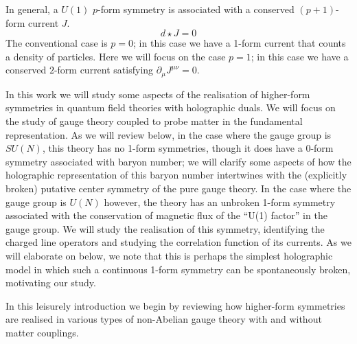 \documentclass[aps,preprint,nofootinbib,preprintnumbers,eqsecnum,superscriptaddress]{revtex4}
\begin{document}
In general, a $U(1)$ $p$-form symmetry is associated with a conserved $(p+1)$-form current $J$.
\begin{equation}
	d \star J = 0	
\end{equation}
The conventional case is $p = 0$; in this case we have a 1-form current that counts a density of particles. Here we will focus on the case $p =1$; in this case we have a conserved $2$-form current satisfying $\partial_\mu J^{\mu \nu} = 0$.  

In this work we will study some aspects of the realisation of higher-form symmetries in quantum field theories with holographic duals. We will focus on the study of gauge theory coupled to probe matter in the fundamental representation. As we will review below, in the case where the gauge group is $SU(N)$, this theory has no 1-form symmetries, though it does have a 0-form symmetry associated with baryon number; we will clarify some aspects of how the holographic representation of this baryon number intertwines with the (explicitly broken) putative center symmetry of the pure gauge theory. In the case where the gauge group is $U(N)$ however, the theory has an unbroken 1-form symmetry associated with the conservation of magnetic flux of the ``U(1) factor'' in the gauge group. We will study the realisation of this symmetry, identifying the charged line operators and studying the correlation function of its currents. As we will elaborate on below, we note that this is perhaps the simplest holographic model in which such a continuous 1-form symmetry can be spontaneously broken, motivating our study. 

In this leisurely introduction we begin by reviewing how higher-form symmetries are realised in various types of non-Abelian gauge theory with and without matter couplings. %
\end{document}
